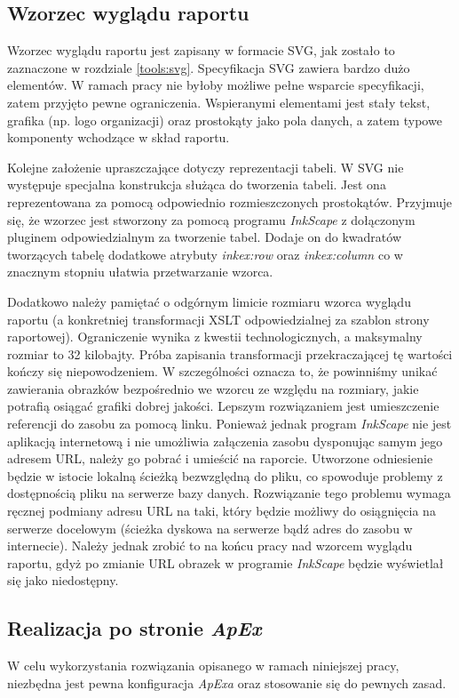 \documentclass[11pt,a4paper]{article}
\begin{document}
\subsection{Wzorzec wyglądu raportu} \label{solution:layout}
Wzorzec wyglądu raportu jest zapisany w formacie SVG, jak zostało to zaznaczone w rozdziale \ref{tools:svg}. Specyfikacja SVG zawiera bardzo dużo elementów. W ramach pracy nie byłoby możliwe pełne wsparcie specyfikacji, zatem przyjęto pewne ograniczenia. Wspieranymi elementami jest stały tekst, grafika (np. logo organizacji) oraz prostokąty jako pola danych, a zatem typowe komponenty wchodzące w skład raportu.

Kolejne założenie upraszczające dotyczy reprezentacji tabeli. W SVG nie występuje specjalna konstrukcja służąca do tworzenia tabeli. Jest ona reprezentowana za pomocą odpowiednio rozmieszczonych prostokątów. Przyjmuje się, że wzorzec jest stworzony za pomocą programu \emph{InkScape} z dołączonym pluginem odpowiedzialnym za tworzenie tabel. Dodaje on do kwadratów tworzących tabelę dodatkowe atrybuty \emph{inkex:row} oraz \emph{inkex:column} co w znacznym stopniu ułatwia przetwarzanie wzorca.

Dodatkowo należy pamiętać o odgórnym limicie rozmiaru wzorca wyglądu raportu (a konkretniej transformacji XSLT odpowiedzialnej za szablon strony raportowej). Ograniczenie wynika z kwestii technologicznych, a maksymalny rozmiar to 32 kilobajty. Próba zapisania transformacji przekraczającej tę wartości kończy się niepowodzeniem. W szczególności oznacza to, że powinniśmy unikać zawierania obrazków bezpośrednio we wzorcu ze względu na rozmiary, jakie potrafią osiągać grafiki dobrej jakości. Lepszym rozwiązaniem jest umieszczenie referencji do zasobu za pomocą linku. Ponieważ jednak program \emph{InkScape} nie jest aplikacją internetową i nie umożliwia załączenia zasobu dysponując samym jego adresem URL, należy go pobrać i umieścić na raporcie. Utworzone odniesienie będzie w istocie lokalną ścieżką bezwzględną do pliku, co spowoduje problemy z dostępnością pliku na serwerze bazy danych. Rozwiązanie tego problemu wymaga ręcznej podmiany adresu URL na taki, który będzie możliwy do osiągnięcia na serwerze docelowym (ścieżka dyskowa na serwerze bądź adres do zasobu w internecie). Należy jednak zrobić to na końcu pracy nad wzorcem wyglądu raportu, gdyż po zmianie URL obrazek w programie \emph{InkScape} będzie wyświetlał się jako niedostępny.


\subsection{Realizacja po stronie \emph{ApEx}} \label{solution:realization}
W celu wykorzystania rozwiązania opisanego w ramach niniejszej pracy, niezbędna jest pewna konfiguracja \emph{ApExa} oraz stosowanie się do pewnych zasad.
\end{document}
